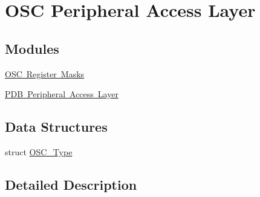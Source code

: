 \hypertarget{group___o_s_c___peripheral___access___layer}{}\section{O\+SC Peripheral Access Layer}
\label{group___o_s_c___peripheral___access___layer}
\subsection*{Modules}
\begin{DoxyCompactItemize}
\item 
\mbox{\hyperlink{group___o_s_c___register___masks}{O\+S\+C Register Masks}}
\item 
\mbox{\hyperlink{group___p_d_b___peripheral___access___layer}{P\+D\+B Peripheral Access Layer}}
\end{DoxyCompactItemize}
\subsection*{Data Structures}
\begin{DoxyCompactItemize}
\item 
struct \mbox{\hyperlink{struct_o_s_c___type}{O\+S\+C\+\_\+\+Type}}
\end{DoxyCompactItemize}


\subsection{Detailed Description}
